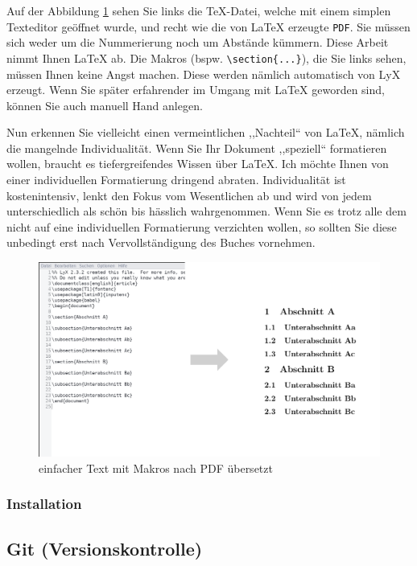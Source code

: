 Auf der Abbildung \ref{fig:latex-beispiel} sehen Sie links die \TeX -Datei,
welche mit einem simplen Texteditor geöffnet wurde, und recht wie
die von \LaTeX{} erzeugte \texttt{PDF}. Sie müssen sich weder um die
Nummerierung noch um Abstände kümmern. Diese Arbeit nimmt Ihnen \LaTeX{}
ab. Die Makros (bspw. \texttt{\textbackslash section\{...\}}), die
Sie links sehen, müssen Ihnen keine Angst machen. Diese werden nämlich
automatisch von LyX erzeugt. Wenn Sie später erfahrender im Umgang
mit \LaTeX{} geworden sind, können Sie auch manuell Hand anlegen.

Nun erkennen Sie vielleicht einen vermeintlichen ,,Nachteil`` von
\LaTeX , nämlich die mangelnde Individualität. Wenn Sie Ihr Dokument
,,speziell`` formatieren wollen, braucht es tiefergreifendes Wissen
über \LaTeX . Ich möchte Ihnen von einer individuellen Formatierung
dringend abraten. Individualität ist kostenintensiv, lenkt den Fokus
vom Wesentlichen ab und wird von jedem unterschiedlich als schön bis
hässlich wahrgenommen. Wenn Sie es trotz alle dem nicht auf eine individuellen
Formatierung verzichten wollen, so sollten Sie diese unbedingt erst
nach Vervollständigung des Buches vornehmen.

\begin{figure}
\centering{}\includegraphics{image_1}\caption{\label{fig:latex-beispiel}einfacher Text mit Makros nach PDF übersetzt}
\end{figure}


\subsubsection{Installation}

\subsection{Git (Versionskontrolle)}

